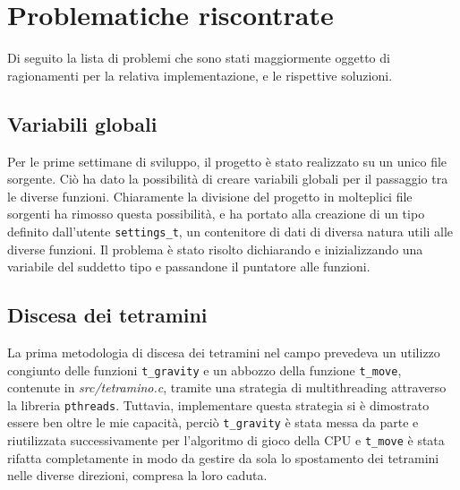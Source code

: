\documentclass[a4paper]{article}
\begin{document}
\newpage

\section{Problematiche riscontrate}
Di seguito la lista di problemi che sono stati maggiormente oggetto di ragionamenti per la relativa implementazione, e le rispettive soluzioni.\\

\subsection{Variabili globali}
Per le prime settimane di sviluppo, il progetto è stato realizzato su un unico file sorgente. Ciò ha dato la possibilità di creare variabili globali per il passaggio tra le diverse funzioni. Chiaramente la divisione del progetto in molteplici file sorgenti ha rimosso questa possibilità, e ha portato alla creazione di un tipo definito dall'utente \texttt{settings_t}, un contenitore di dati di diversa natura utili alle diverse funzioni. Il problema è stato risolto dichiarando e inizializzando una variabile del suddetto tipo e passandone il puntatore alle funzioni.

\subsection{Discesa dei tetramini}
La prima metodologia di discesa dei tetramini nel campo prevedeva un utilizzo congiunto delle funzioni \texttt{t_gravity} e un abbozzo della funzione \texttt{t_move}, contenute in \textit{src/tetramino.c}, tramite una strategia di multithreading attraverso la libreria \texttt{pthreads}. Tuttavia, implementare questa strategia si è dimostrato essere ben oltre le mie capacità, perciò \texttt{t_gravity} è stata messa da parte e riutilizzata successivamente per l'algoritmo di gioco della CPU e \texttt{t_move} è stata rifatta completamente in modo da gestire da sola lo spostamento dei tetramini nelle diverse direzioni, compresa la loro caduta.
\end{document}

